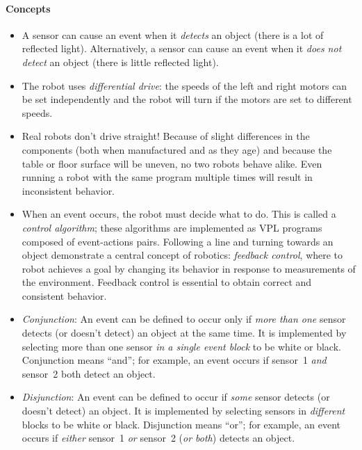 \documentclass[11pt,a4paper,english]{article}
\begin{document}
\paragraph{Concepts}
\begin{itemize}

\item A sensor can cause an event when it \emph{detects} an object
(there is a lot of reflected light). Alternatively, a sensor can cause
an event when it \emph{does not detect} an object (there is little
reflected light).

\item The robot uses \emph{differential drive}: the speeds of the left
and right motors can be set independently and the robot will turn if the
motors are set to different speeds.

\item Real robots don't drive straight! Because of slight differences in
the components (both when manufactured and as they age) and because the
table or floor surface will be uneven, no two robots behave alike. Even
running a robot with the same program multiple times will result in
inconsistent behavior. 

\item When an event occurs, the robot must decide what to do. This is
called a \emph{control algorithm}; these algorithms are implemented as
VPL programs composed of event-actions pairs. Following a line and
turning towards an object demonstrate a central concept of robotics:
\emph{feedback control}, where to robot achieves a goal by changing its
behavior in response to measurements of the environment. Feedback
control is essential to obtain correct and consistent behavior.

\item \emph{Conjunction}: An event can be defined to occur only if \emph{more than one}
sensor detects (or doesn't detect) an object at the same time. It is
implemented by selecting more than one sensor \emph{in a single event
block} to be white or black. Conjunction means ``and''; for example, an
event occurs if sensor~1 \emph{and} sensor~2 both detect an object.

\item \emph{Disjunction}: An event can be defined to occur if
\emph{some} sensor detects (or doesn't detect) an object. It is
implemented by selecting sensors in \emph{different} blocks to be white
or black. Disjunction means ``or''; for example, an event occurs if
\emph{either} sensor~1 \emph{or} sensor~2 (\emph{or both}) detects an object.

\end{itemize}
\end{document}
